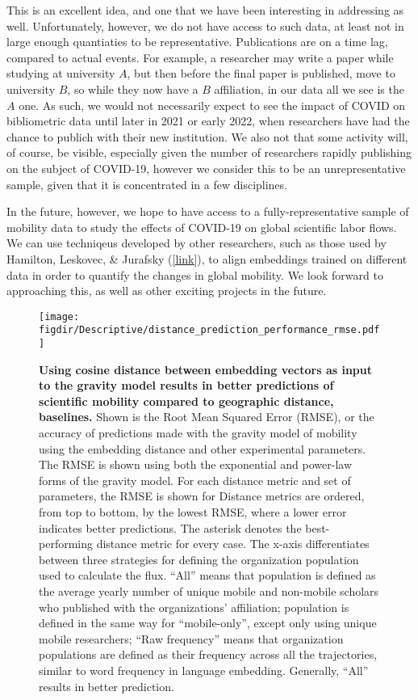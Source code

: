 \documentclass[12pt,a4paper]{article}
\def\figdir{../Figs}
\newcommand{\response}[1]{{\leavevmode\noindent #1}}
\begin{document}
\response{
This is an excellent idea, and one that we have been interesting in addressing as well. 
Unfortunately, however, we do not have access to such data, at least not in large enough quantiaties to be representative. 
Publications are on a time lag, compared to actual events.
For example, a researcher may write a paper while studying at university $A$, but then before the final paper is published, move to university $B$, so while they now have a $B$ affiliation, in our data all we see is the $A$ one. 
As such, we would not necessarily expect to  see the impact of COVID on bibliometric data until later in 2021 or early 2022, when researchers have had the chance to publich with their new institution.
We also not that some activity will, of course, be visible, especially given the number of researchers rapidly publishing on the subject of COVID-19, however we consider this to be an unrepresentative sample, given that it is concentrated in a few disciplines.  

In the future, however, we hope to have access to a fully-representative sample of mobility data to study the effects of COVID-19 on global scientific labor flows. 
We can use techniqeus developed by other researchers, such as those used by Hamilton, Leskovec, \& Jurafsky (\href{https://nlp.stanford.edu/projects/histwords/}{[link]}), to align embeddings trained on different data in order to quantify the changes in global mobility. 
We look forward to approaching this, as well as other exciting projects in the future. 
}

\clearpage
\begin{figure}[p!]
	\centering
	\texttt{[image: \\figdir/Descriptive/distance\_prediction\_performance\_rmse.pdf]}
	\caption{
		\textbf{Using cosine distance between embedding vectors as input to the gravity model results in better predictions of scientific mobility compared to geographic distance, baselines.}
		Shown is the Root Mean Squared Error (RMSE), or the accuracy of predictions made with the gravity model of mobility using the embedding distance and other experimental parameters.
		The RMSE is shown using both the exponential and power-law forms of the gravity model. 
		For each distance metric and set of parameters, the RMSE is shown for 
		Distance metrics are ordered, from top to bottom, by the lowest RMSE, where a lower error indicates better predictions. 
		The asterisk denotes the best-performing distance metric for every case. 
		The x-axis differentiates between three strategies for defining the organization population used to calculate the flux. 
		``All'' means that population is defined as the average yearly number of unique mobile and non-mobile scholars who published with the organizations' affiliation;
		population is defined in the same way for ``mobile-only'', except only using unique mobile researchers;
		``Raw frequency'' means that organization populations are defined as their frequency across all the trajectories, similar to word frequency in language embedding. 
		Generally, ``All'' results in better prediction.
		}
	\label{fig:supp:distancermse}
\end{figure}


%

\end{document}
